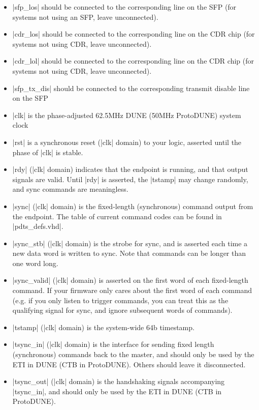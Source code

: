 \documentclass[a4paper,11pt]{article}
\begin{document}
\begin{itemize}
\item |sfp_los| should be connected to the corresponding line on the SFP (for systems
not using an SFP, leave unconnected).

\item |cdr_los| should be connected to the corresponding line on the CDR chip (for systems not using
CDR, leave unconnected).

\item |cdr_lol| should be connected to the corresponding line on the CDR chip (for systems not using
CDR, leave unconnected).

\item |sfp_tx_dis| should be connected to the corresponding transmit disable line on the SFP

\item |clk| is the phase-adjusted 62.5MHz DUNE (50MHz ProtoDUNE) system clock

\item |rst| is a synchronous reset (|clk| domain) to your logic, asserted until the phase of |clk|
is stable.

\item |rdy| (|clk| domain) indicates that the endpoint is running, and that output signals are
valid. Until |rdy| is asserted, the |tstamp| may change randomly, and sync commands are
meaningless.

\item |sync| (|clk| domain) is the fixed-length (synchronous) command output from the endpoint. The table of current
command codes can be found in |pdts_defs.vhd|.

\item |sync_stb| (|clk| domain) is the strobe for sync, and is asserted each time a new data word is
written to sync. Note that commands can be longer than one word long.

\item |sync_valid| (|clk| domain) is asserted on the first word of each fixed-length command. If your firmware only
cares about the first word of each command (e.g. if you only listen to trigger
commands, you can treat this as the qualifying signal for sync, and ignore
subsequent words of commands).

\item |tstamp| (|clk| domain) is the system-wide 64b timestamp.

\item |tsync_in| (|clk| domain) is the interface for sending fixed length (synchronous) commands back to the master, and should
only be used by the ETI in DUNE (CTB in ProtoDUNE). Others should leave it disconnected.

\item |tsync_out| (|clk| domain) is the handshaking signals accompanying |tsync_in|, and should
only be used by the ETI in DUNE (CTB in ProtoDUNE).

\end{itemize}
\end{document}
